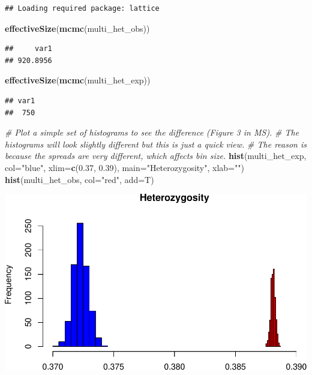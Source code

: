 \documentclass[]{article}
\newenvironment{Shaded}{\begin{snugshade}}{\end{snugshade}}
\newcommand{\KeywordTok}[1]{\textcolor[rgb]{0.13,0.29,0.53}{\textbf{{#1}}}}
\newcommand{\DataTypeTok}[1]{\textcolor[rgb]{0.13,0.29,0.53}{{#1}}}
\newcommand{\FloatTok}[1]{\textcolor[rgb]{0.00,0.00,0.81}{{#1}}}
\newcommand{\StringTok}[1]{\textcolor[rgb]{0.31,0.60,0.02}{{#1}}}
\newcommand{\CommentTok}[1]{\textcolor[rgb]{0.56,0.35,0.01}{\textit{{#1}}}}
\newcommand{\NormalTok}[1]{{#1}}
\begin{document}
\begin{verbatim}
## Loading required package: lattice
\end{verbatim}

\begin{Shaded}
\begin{Highlighting}[]
\KeywordTok{effectiveSize}\NormalTok{(}\KeywordTok{mcmc}\NormalTok{(multi_het_obs))}
\end{Highlighting}
\end{Shaded}

\begin{verbatim}
##     var1 
## 920.8956
\end{verbatim}

\begin{Shaded}
\begin{Highlighting}[]
\KeywordTok{effectiveSize}\NormalTok{(}\KeywordTok{mcmc}\NormalTok{(multi_het_exp))}
\end{Highlighting}
\end{Shaded}

\begin{verbatim}
## var1 
##  750
\end{verbatim}

\begin{Shaded}
\begin{Highlighting}[]
\CommentTok{# Plot a simple set of histograms to see the difference (Figure 3 in MS).}
\CommentTok{# The histograms will look slightly different but this is just a quick view.}
\CommentTok{# The reason is because the spreads are very different, which affects bin size.}
\KeywordTok{hist}\NormalTok{(multi_het_exp, }\DataTypeTok{col=}\StringTok{"blue"}\NormalTok{, }\DataTypeTok{xlim=}\KeywordTok{c}\NormalTok{(}\FloatTok{0.37}\NormalTok{, }\FloatTok{0.39}\NormalTok{), }
     \DataTypeTok{main=}\StringTok{"Heterozygosity"}\NormalTok{, }\DataTypeTok{xlab=}\StringTok{""}\NormalTok{)}
\KeywordTok{hist}\NormalTok{(multi_het_obs, }\DataTypeTok{col=}\StringTok{"red"}\NormalTok{, }\DataTypeTok{add=}\NormalTok{T)}
\end{Highlighting}
\end{Shaded}

\includegraphics{supplement_files/figure-latex/unnamed-chunk-4-1.pdf}
\end{document}
